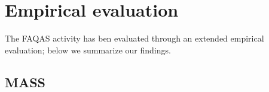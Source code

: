 

\section{Empirical evaluation}
\label{sec:summary:results}

The FAQAS activity has ben evaluated through an extended empirical evaluation; below we summarize our findings.


\subsection{MASS}

%
%
%
%
%
%
%

